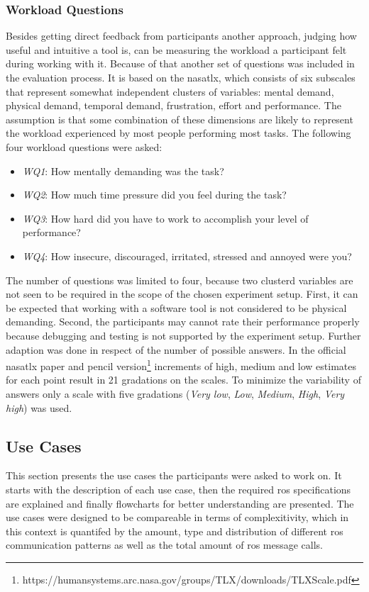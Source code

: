 \subsubsection*{Workload Questions}
Besides getting direct feedback from participants another approach, judging how useful and intuitive a tool is, can be measuring the workload a participant felt during working with it. Because of that another set of questions was included in the evaluation process. It is based on the \gls{nasatlx}\cite{HART1988139}, which consists of six subscales that represent somewhat independent clusters of variables: mental demand, physical demand, temporal demand, frustration, effort and performance. The assumption is that some combination of these dimensions are likely to represent the workload experienced by most people performing most tasks. The following four workload questions were asked:
\begin{itemize}
    \item \textit{WQ1}: How mentally demanding was the task?
    \item \textit{WQ2}: How much time pressure did you feel during the task?
    \item \textit{WQ3}: How hard did you have to work to accomplish your level of performance?
    \item \textit{WQ4}: How insecure, discouraged, irritated, stressed and annoyed were you?
\end{itemize}
The number of questions was limited to four, because two clusterd variables are not seen to be required in the scope of the chosen experiment setup. First, it can be expected that working with a software tool is not considered to be physical demanding. Second, the participants may cannot rate their performance properly because debugging and testing is not supported by the experiment setup. Further adaption was done in respect of the number of possible answers. In the official \gls{nasatlx} paper and pencil version\footnote{https://humansystems.arc.nasa.gov/groups/TLX/downloads/TLXScale.pdf} increments of high, medium and low estimates for each point result in 21 gradations on the scales. To minimize the variability of answers only a scale with five gradations (\textit{Very low}, \textit{Low}, \textit{Medium}, \textit{High}, \textit{Very high}) was used.

\subsection{Use Cases}
This section presents the use cases the participants were asked to work on. It starts with the description of each use case, then the required \gls{ros} specifications are explained and finally flowcharts for better understanding are presented. The use cases were designed to be compareable in terms of complexitivity, which in this context is quantifed by the amount, type and distribution of different \gls{ros} communication patterns as well as the total amount of \gls{ros} message calls.

